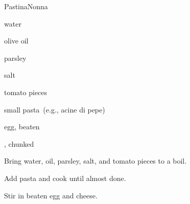 \begin{recipe}{Pastina}{Nonna}{}

\begin{ingredients}
\item water
\item olive oil
\item parsley
\item salt
\item tomato pieces
\item small pasta~(e.g., acine di pepe)
\item egg, beaten
\item {}, chunked
\end{ingredients}

\begin{directions}
\item Bring water, oil, parsley, salt, and tomato pieces to a boil.
\item Add pasta and cook until almost done.
\item Stir in beaten egg and cheese.
\end{directions}

\end{recipe}
